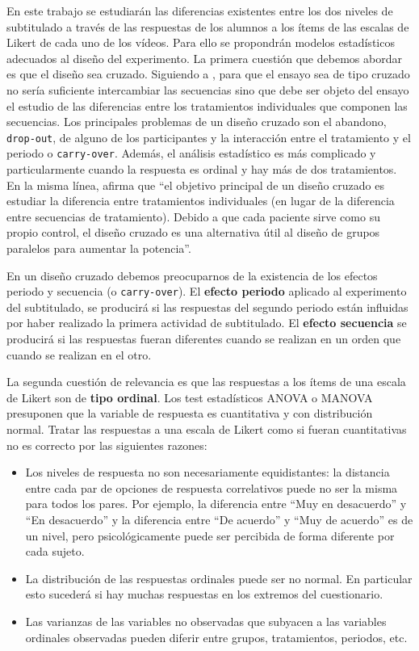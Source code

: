 \documentclass[
  12pt,
  a4paper,
  extrafontsizes,
  onecolumn,
  openright,
  table]{memoir}
\begin{document}
En este trabajo se estudiarán las diferencias existentes entre los dos
niveles de subtitulado a través de las respuestas de los alumnos a los
ítems de las escalas de Likert de cada uno de los vídeos. Para ello se
propondrán modelos estadísticos adecuados al diseño del experimento. La
primera cuestión que debemos abordar es que el diseño sea cruzado.
Siguiendo a \textcite{senn2022}, para que el ensayo sea de tipo cruzado
no sería suficiente intercambiar las secuencias sino que debe ser objeto
del ensayo el estudio de las diferencias entre los tratamientos
individuales que componen las secuencias. Los principales problemas de
un diseño cruzado son el abandono, \texttt{drop-out}, de alguno de los
participantes y la interacción entre el tratamiento y el periodo o
\texttt{carry-over}. Además, el análisis estadístico es más complicado y
particularmente cuando la respuesta es ordinal y hay más de dos
tratamientos. En la misma línea, \textcite{lui2016} afirma que
\enquote{el objetivo principal de un diseño cruzado es estudiar la
diferencia entre tratamientos individuales (en lugar de la diferencia
entre secuencias de tratamiento). Debido a que cada paciente sirve como
su propio control, el diseño cruzado es una alternativa útil al diseño
de grupos paralelos para aumentar la potencia}.

En un diseño cruzado debemos preocuparnos de la existencia de los
efectos periodo y secuencia (o \texttt{carry-over}). El \textbf{efecto
periodo} aplicado al experimento del subtitulado, se producirá si las
respuestas del segundo periodo están influidas por haber realizado la
primera actividad de subtitulado. El \textbf{efecto secuencia} se
producirá si las respuestas fueran diferentes cuando se realizan en un
orden que cuando se realizan en el otro.

La segunda cuestión de relevancia es que las respuestas a los ítems de
una escala de Likert son de \textbf{tipo ordinal}. Los test estadísticos
ANOVA o MANOVA presuponen que la variable de respuesta es cuantitativa y
con distribución normal. Tratar las respuestas a una escala de Likert
como si fueran cuantitativas no es correcto por las siguientes razones:

\begin{itemize}
\item
  Los niveles de respuesta no son necesariamente equidistantes: la
  distancia entre cada par de opciones de respuesta correlativos puede
  no ser la misma para todos los pares. Por ejemplo, la diferencia entre
  \enquote{Muy en desacuerdo} y \enquote{En desacuerdo} y la diferencia
  entre \enquote{De acuerdo} y \enquote{Muy de acuerdo} es de un nivel,
  pero psicológicamente puede ser percibida de forma diferente por cada
  sujeto.
\item
  La distribución de las respuestas ordinales puede ser no normal. En
  particular esto sucederá si hay muchas respuestas en los extremos del
  cuestionario.
\item
  Las varianzas de las variables no observadas que subyacen a las
  variables ordinales observadas pueden diferir entre grupos,
  tratamientos, periodos, etc.
\end{itemize}
\end{document}
